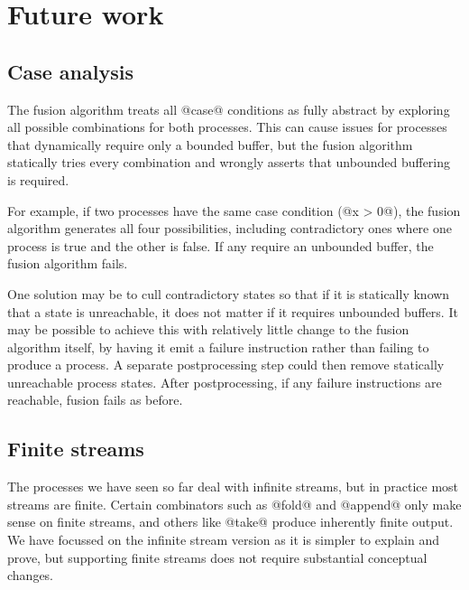 
\section{Future work}
\label{s:FutureWork}


\subsection{Case analysis}
\label{s:FullyAbstractCase}

The fusion algorithm treats all @case@ conditions as fully abstract by exploring all possible combinations for both processes.
This can cause issues for processes that dynamically require only a bounded buffer, but the fusion algorithm statically tries every combination and wrongly asserts that unbounded buffering is required.

For example, if two processes have the same case condition (@x > 0@), the fusion algorithm generates all four possibilities, including contradictory ones where one process is true and the other is false.
If any require an unbounded buffer, the fusion algorithm fails.

One solution may be to cull contradictory states so that if it is statically known that a state is unreachable, it does not matter if it requires unbounded buffers.
It may be possible to achieve this with relatively little change to the fusion algorithm itself, by having it emit a failure instruction rather than failing to produce a process.
A separate postprocessing step could then remove statically unreachable process states.
After postprocessing, if any failure instructions are reachable, fusion fails as before.


\subsection{Finite streams}
\label{s:Finite}

The processes we have seen so far deal with infinite streams, but in practice most streams are finite. Certain combinators such as @fold@ and @append@ only make sense on finite streams, and others like @take@ produce inherently finite output. We have focussed on the infinite stream version as it is simpler to explain and prove, but supporting finite streams does not require substantial conceptual changes.

